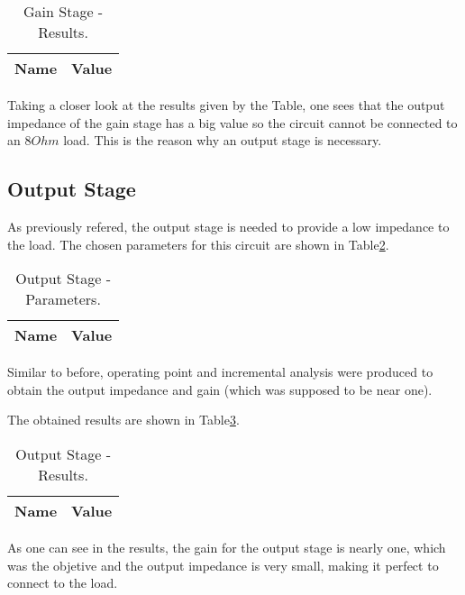 \begin{table}[h]
  \centering
  \begin{tabular}{|l|r|}
    \hline    
    {\bf Name} & {\bf Value}\\ \hline
    
  \end{tabular}
  \caption{Gain Stage - Results.}
  \label{tab:gr}
\end{table}


\par Taking a closer look at the results given by the Table, one sees that the output impedance of the gain stage has a big value so the circuit cannot be connected to an $8 Ohm$ load. This is the reason why an output stage is necessary.

\newpage

\subsection{Output Stage}
\par As previously refered, the output stage is needed to provide a low impedance to the load. The chosen parameters for this circuit are shown in Table\ref{tab:dadoso}.

\begin{table}[h]
  \centering
  \begin{tabular}{|l|r|}
    \hline    
    {\bf Name} & {\bf Value}\\ \hline
    
  \end{tabular}
  \caption{Output Stage - Parameters.}
  \label{tab:dadoso}
\end{table}


\par Similar to before, operating point and incremental analysis were produced to obtain the output impedance and gain (which was supposed to be near one).

\par The obtained results are shown in Table\ref{tab:or}.

\begin{table}[h]
  \centering
  \begin{tabular}{|l|r|}
    \hline    
    {\bf Name} & {\bf Value}\\ \hline
    
  \end{tabular}
  \caption{Output Stage - Results.}
  \label{tab:or}
\end{table}

\par As one can see in the results, the gain for the output stage is nearly one, which was the objetive and the output impedance is very small, making it perfect to connect to the load.

